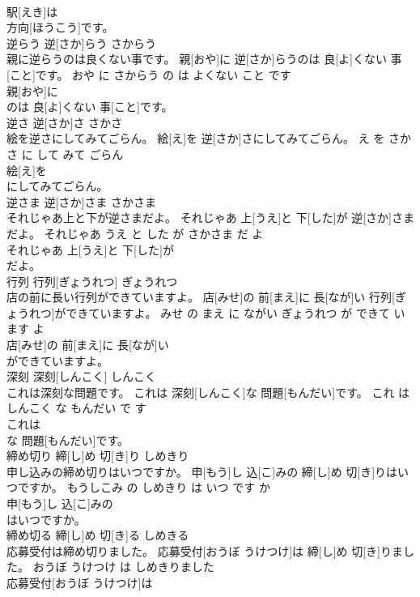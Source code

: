 \documentclass[8pt]{extreport}
\begin{document}
\begin{CJK}{UTF8}{min}
\\	駅[えき]は
\\	方向[ほうこう]です。			
\\	逆らう	逆[さか]らう	さからう	
\\	親に逆らうのは良くない事です。	親[おや]に 逆[さか]らうのは 良[よ]くない 事[こと]です。	おや に さからう の は よくない こと です	
\\	親[おや]に
\\	のは 良[よ]くない 事[こと]です。			
\\	逆さ	逆[さか]さ	さかさ	
\\	絵を逆さにしてみてごらん。	絵[え]を 逆[さか]さにしてみてごらん。	え を さかさ に して みて ごらん	
\\	絵[え]を
\\	にしてみてごらん。			
\\	逆さま	逆[さか]さま	さかさま	
\\	それじゃあ上と下が逆さまだよ。	それじゃあ 上[うえ]と 下[した]が 逆[さか]さまだよ。	それじゃあ うえ と した が さかさま だ よ	
\\	それじゃあ 上[うえ]と 下[した]が
\\	だよ。			
\\	行列	行列[ぎょうれつ]	ぎょうれつ	
\\	店の前に長い行列ができていますよ。	店[みせ]の 前[まえ]に 長[なが]い 行列[ぎょうれつ]ができていますよ。	みせ の まえ に ながい ぎょうれつ が できて います よ	
\\	店[みせ]の 前[まえ]に 長[なが]い
\\	ができていますよ。			
\\	深刻	深刻[しんこく]	しんこく	
\\	これは深刻な問題です。	これは 深刻[しんこく]な 問題[もんだい]です。	これ は しんこく な もんだい で す	
\\	これは
\\	な 問題[もんだい]です。			
\\	締め切り	締[し]め 切[き]り	しめきり	
\\	申し込みの締め切りはいつですか。	申[もう]し 込[こ]みの 締[し]め 切[き]りはいつですか。	もうしこみ の しめきり は いつ です か	
\\	申[もう]し 込[こ]みの
\\	はいつですか。			
\\	締め切る	締[し]め 切[き]る	しめきる	
\\	応募受付は締め切りました。	応募受付[おうぼ うけつけ]は 締[し]め 切[き]りました。	おうぼ うけつけ は しめきりました	
\\	応募受付[おうぼ うけつけ]は

\end{CJK}
\end{document}
